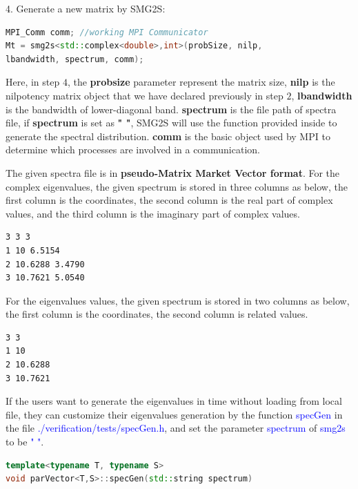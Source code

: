 4. Generate a new matrix by SMG2S:

\begin{lstlisting}[language=C++,frame=single]
MPI_Comm comm; //working MPI Communicator
Mt = smg2s<std::complex<double>,int>(probSize, nilp, 
lbandwidth, spectrum, comm);
\end{lstlisting}


Here, in step $4$, the \textbf{probsize} parameter represent the matrix size, \textbf{nilp} is the nilpotency matrix object that we have declared previously in step $2$, \textbf{lbandwidth} is the bandwidth of lower-diagonal band. \textbf{spectrum} is the file path of spectra file, if \textbf{spectrum} is set as \textbf{" "}, SMG2S will use the function provided inside to generate the spectral distribution. \textbf{comm} is the basic object used by MPI to determine which processes are involved in a communication.

The given spectra file is in \textbf{pseudo-Matrix Market Vector format}. For the complex eigenvalues, the given spectrum is stored in three columns as below, the first column is the coordinates, the second column is the real part of complex values, and the third column is the imaginary part of complex values.

\begin{lstlisting}[language=bash,frame=single]
%%MatrixMarket matrix coordinate complex general
3 3 3
1 10 6.5154
2 10.6288 3.4790
3 10.7621 5.0540
\end{lstlisting}

For the eigenvalues values, the given spectrum is stored in two columns as below, the first column is the coordinates, the second column is related values.

\begin{lstlisting}[language=bash,frame=single]
%%MatrixMarket matrix coordinate real general
3 3
1 10
2 10.6288
3 10.7621
\end{lstlisting}

If the users want to generate the eigenvalues in time without loading from local file, they can customize their eigenvalues generation by the function \textcolor{blue}{specGen} in the file \textcolor{blue}{./verification/tests/specGen.h}, and set the parameter \textcolor{blue}{spectrum} of \textcolor{blue}{smg2s} to be \textcolor{blue}{" "}.

\begin{lstlisting}[language=C++,frame=single]
template<typename T, typename S>
void parVector<T,S>::specGen(std::string spectrum)
\end{lstlisting}

